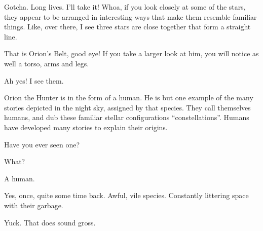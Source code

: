 \documentclass[main.tex]{subfiles}
\begin{document}
\newpara \Maia Gotcha.  Long lives.  I'll take it!  Whoa, if you look closely at some of the stars, they appear to be arranged in interesting ways that make them resemble familiar things.  Like, over there, I see three stars are close together that form a straight line.

\newpara \Pleione That is Orion's Belt, good eye!  If you take a larger look at him, you will notice as well a torso, arms and legs.  

\newpara \Maia Ah yes!  I see them.  






\newpara \Pleione Orion the Hunter is in the form of a human.  He is but one example of the many stories depicted in the night sky, assigned by that species.  They call themselves humans, and dub these familiar stellar configurations ``constellations''.  Humans have developed many stories to explain their origins.

\newpara \Maia Have you ever seen one?

\newpara \Pleione What?

\newpara \Maia A human.

\newpara \Pleione Yes, once, quite some time back.  Awful, vile species.  Constantly littering space with their garbage.

\newpara \Maia Yuck.  That does sound gross.  
\end{document}
